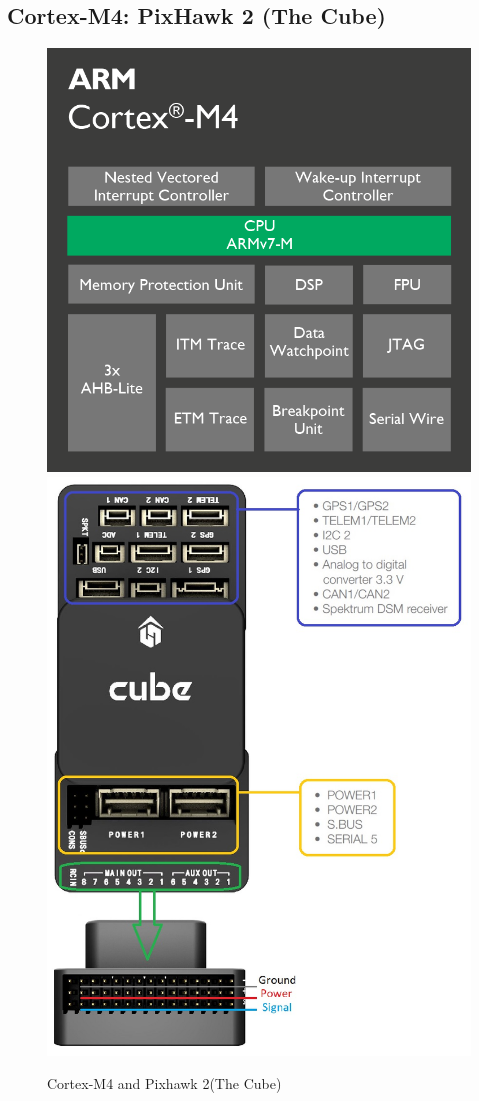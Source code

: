 \documentclass[conference,12pt, ]{IEEEtran}
\begin{document}
\subsection{Cortex-M4: PixHawk 2 (The Cube)}
\begin{figure}
	\includegraphics[scale=0.12]{cortex.png}
	\includegraphics[scale=0.25]{cube.jpg}
	\caption{Cortex-M4 and Pixhawk 2(The Cube)}
\end{figure}
\end{document}
